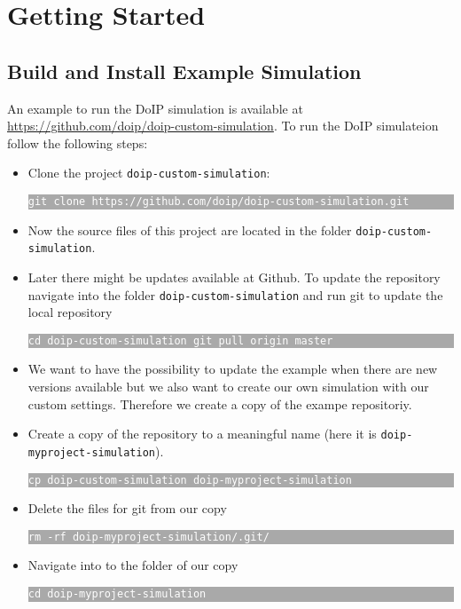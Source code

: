 \documentclass[a4paper]{article}
\newcommand{\code}[1]{\texttt{#1}}
\newcommand{\terminal}[1]{

\colorbox{darkgray}{\parbox{\linewidth}{\texttt{\textcolor{white}{\footnotesize{#1}}}}}

}
\begin{document}
\section{Getting Started}

	\subsection{Build and Install Example Simulation}

		An example to run the DoIP simulation is available at 
		\url{https://github.com/doip/doip-custom-simulation}.
		To run the DoIP simulateion follow the following steps:

		\begin{itemize}
			\item Clone the project \code{doip-custom-simulation}:

			\terminal{git clone https://github.com/doip/doip-custom-simulation.git}

			\item Now the source files of this project are located in the
			folder \code{doip-custom-simulation}. 

			\item Later there might be updates available at Github. To 
			update the repository navigate into the folder 
			\code{doip-custom-simulation} and run git to update the local
			repository

			\terminal{cd doip-custom-simulation \newline
			git pull origin master}

			\item We want to have the possibility to update the example 
			when there are new versions available but we also want
			to create our own simulation with our custom settings. Therefore
			we create a copy of the exampe repositoriy.
			
			\item Create a copy of the repository to a meaningful name (here
				it is \code{doip-myproject-simulation}).

			\terminal{cp doip-custom-simulation doip-myproject-simulation}

			\item Delete the files for git from our copy

			\terminal{rm -rf doip-myproject-simulation/.git/}

			\item Navigate into to the folder of our copy

			\terminal{cd doip-myproject-simulation}


\end{itemize}
\end{document}
